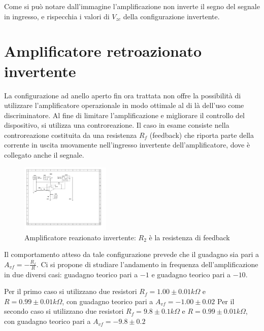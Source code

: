 \documentclass[journal]{IEEEtran}
\begin{document}
Come si può notare dall'immagine l'amplificazione non inverte il segno del segnale in ingresso, e rispecchia i valori di $V_{zc}$ della configurazione invertente.


\section{\textbf{Amplificatore retroazionato invertente}} %

La configurazione ad anello aperto fin ora trattata non offre la possibilità di utilizzare l'amplificatore operazionale in modo ottimale al di là dell'uso come discriminatore. Al fine di limitare l'amplificazione e migliorare il controllo del dispositivo, si utilizza una controreazione.
Il caso in esame consiste nella controreazione costituita da una resistenza $R_f$ (feedback) che riporta parte della corrente in uscita nuovamente nell'ingresso invertente dell'amplificatore, dove è collegato anche il segnale.

\begin{figure}[H]%
\begin {center}
\includegraphics[width=0.38\textwidth]{sch-simulations/output/OPA-closed-loop-inverting.pdf}
\caption{Amplificatore reazionato invertente: $R_2$ è la resistenza di feedback}
\label{fig:oscilloscope}
\end {center}
\end{figure}

Il comportamento atteso da tale configurazione prevede che il guadagno sia pari a $A_{vf} = -\frac{R_f}{R}$. 
Ci si propone di studiare l'andamento in frequenza dell'amplificazione in due diversi casi: guadagno teorico pari a $-1$ e guadagno teorico pari a $-10$.

Per il primo caso si utilizzano due resistori $R_f = 1.00 \pm 0.01 k\Omega $ e $R = 0.99 \pm 0.01 k\Omega$, con guadagno teorico pari a $A_{vf} = -1.00 \pm 0.02 $ Per il secondo caso si utilizzano due resistori $R_f = 9.8 \pm 0.1 k\Omega $ e $R = 0.99 \pm 0.01 k\Omega$, con guadagno teorico pari a $A_{vf} = -9.8 \pm 0.2$
\end{document}
